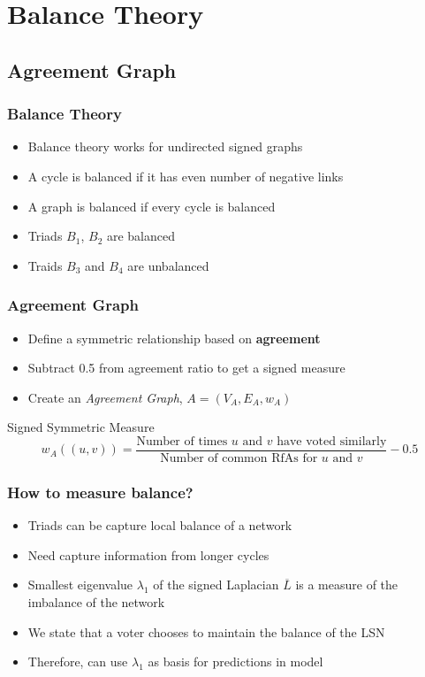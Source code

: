 \documentclass{beamer}
\begin{document}
\section{Balance Theory}

\subsection{Agreement Graph}
\begin{frame}
    \frametitle{Balance Theory}
    \begin{itemize}
        \item Balance theory works for undirected signed graphs
        \item A cycle is balanced if it has even number of negative links
        \item A graph is balanced if every cycle is balanced
        \item Triads $B_1$, $B_2$ are balanced
        \item Traids $B_3$ and $B_4$ are unbalanced
    \end{itemize}
    \begin{figure}
        \centering
        \scalebox{0.75}{}
    \end{figure}

\end{frame}

\begin{frame}
    \frametitle{Agreement Graph}
    \begin{itemize}
        \item Define a symmetric relationship based on \textbf{agreement} 
        \item Subtract 0.5 from agreement ratio to get a signed measure
        \item Create an \textit{Agreement Graph}, $A=(V_A,E_A,w_A)$
    \end{itemize}
    \begin{block}{Signed Symmetric Measure}
        $$w_{A}((u,v)) = \frac{\text{Number of times } u \text{ and } v \text{ have voted similarly}}{\text{Number of common RfAs for } u \text{ and } v} -0.5$$
    \end{block}

\end{frame}

\begin{frame}
    \frametitle{How to measure balance?}
    \begin{itemize}
        \item Triads can be capture local balance of a network
        \item Need capture information from longer cycles \cite{chiang2011exploiting}
        \item Smallest eigenvalue $\lambda_{1}$ of the signed Laplacian $\overline{L}$ is a measure of the imbalance of the network \cite{hou2005bounds}
        \item  We state that a voter chooses to maintain the balance of the LSN
        \item Therefore, can use $\lambda_{1}$ as basis for predictions in model
    \end{itemize}
    

\end{frame}
\end{document}
